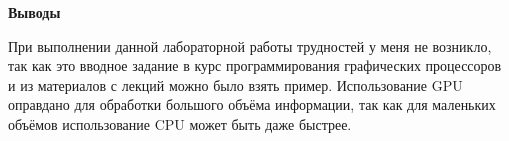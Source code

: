 \textbf{\large Выводы}

При выполнении данной лабораторной работы трудностей у меня не возникло, так как это вводное задание в курс программирования графических процессоров и из материалов с лекций можно было взять пример. Использование GPU оправдано для обработки большого объёма информации, так как для маленьких объёмов использование CPU может быть даже быстрее.